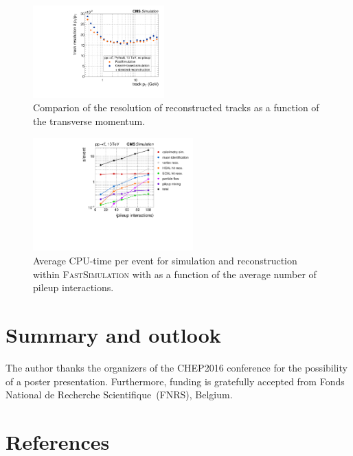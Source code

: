 \documentclass[a4paper]{jpconf}
\begin{document}
\begin{figure}[htbp]
\begin{center}
\includegraphics[width=0.45\textwidth]{figures/res_pt.pdf}
\caption{Comparion of the resolution of reconstructed tracks as a function of the transverse momentum.}
\end{center}
\end{figure}

\begin{figure}[htbp]
\begin{center}
\includegraphics[width=0.55\textwidth]{figures/cpu_profile.pdf}
\caption{Average CPU-time per event for simulation and reconstruction within \textsc{FastSimulation} with as a function of the average number of pileup interactions.}
\end{center}
\end{figure}

\section{Summary and outlook}

\ack
The author thanks the organizers of the \textsc{CHEP2016} conference for the possibility of a poster presentation. Furthermore, funding is gratefully accepted from Fonds National de Recherche Scientifique~(FNRS), Belgium.


\section{References}
\end{document}
